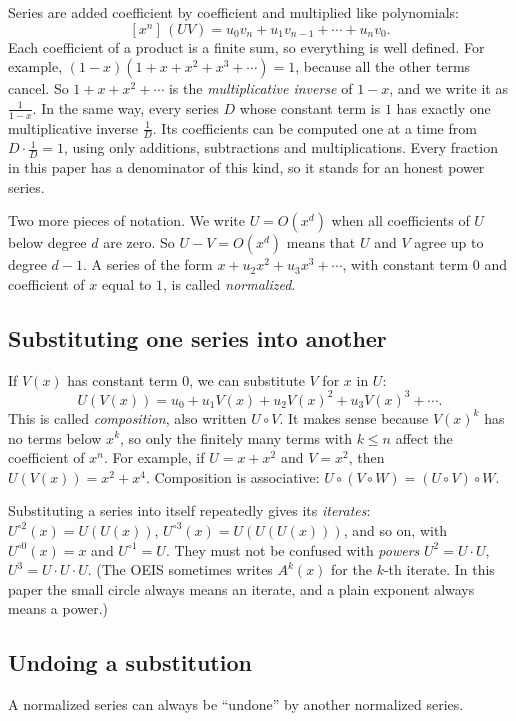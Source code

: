 \documentclass[11pt,a4paper]{article}
\theoremstyle{definition}
\theoremstyle{remark}
\newcommand{\coeff}[2]{[x^{#1}]\,#2}
\begin{document}
Series are added coefficient by coefficient and multiplied like polynomials:
\[
\coeff{n}{(UV)}=u_0v_n+u_1v_{n-1}+\cdots+u_nv_0 .
\]
Each coefficient of a product is a finite sum, so everything is well defined. For example,
$(1-x)(1+x+x^2+x^3+\cdots)=1$, because all the other terms cancel. So $1+x+x^2+\cdots$ is the
\emph{multiplicative inverse} of $1-x$, and we write it as $\frac{1}{1-x}$. In the same way, every series $D$ whose
constant term is $1$ has exactly one multiplicative inverse $\frac1D$. Its coefficients can be computed one at a time
from $D\cdot\frac1D=1$, using only additions, subtractions and multiplications. Every fraction in this paper has a
denominator of this kind, so it stands for an honest power series.

Two more pieces of notation. We write $U=O(x^d)$ when all coefficients of $U$ below degree $d$ are zero. So
$U-V=O(x^d)$ means that $U$ and $V$ agree up to degree $d-1$. A series of the form $x+u_2x^2+u_3x^3+\cdots$, with
constant term $0$ and coefficient of $x$ equal to $1$, is called \emph{normalized}.

\subsection{Substituting one series into another}
If $V(x)$ has constant term $0$, we can substitute $V$ for $x$ in $U$:
\[
U(V(x))=u_0+u_1V(x)+u_2V(x)^2+u_3V(x)^3+\cdots .
\]
This is called \emph{composition}, also written $U\circ V$. It makes sense because $V(x)^k$ has no terms below $x^k$,
so only the finitely many terms with $k\le n$ affect the coefficient of $x^n$. For example, if $U=x+x^2$ and $V=x^2$, then
$U(V(x))=x^2+x^4$. Composition is associative: $U\circ(V\circ W)=(U\circ V)\circ W$.

Substituting a series into itself repeatedly gives its \emph{iterates}: $U^{\circ2}(x)=U(U(x))$,
$U^{\circ3}(x)=U(U(U(x)))$, and so on, with $U^{\circ0}(x)=x$ and $U^{\circ1}=U$. They must not be confused with
\emph{powers} $U^2=U\cdot U$, $U^3=U\cdot U\cdot U$. (The OEIS sometimes writes $A^k(x)$ for the $k$-th iterate. In
this paper the small circle always means an iterate, and a plain exponent always means a power.)

\subsection{Undoing a substitution}
A normalized series can always be ``undone'' by another normalized series.
\end{document}

